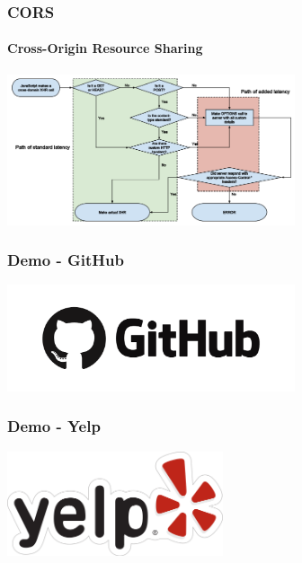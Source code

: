\documentclass{beamer}
\begin{document}
\begin{frame}
  \frametitle{CORS}
  \framesubtitle{Cross-Origin Resource Sharing}
  \begin{center}
    \includegraphics[width=320]{img/cors-diagram.png}
  \end{center}
\end{frame}


\begin{frame}
  \frametitle{Demo - GitHub}
  \begin{center}
    \includegraphics[width=320]{img/github-logo.png}
  \end{center}
\end{frame}


\begin{frame}
  \frametitle{Demo - Yelp}
  \begin{center}
    \includegraphics[width=240]{img/yelp-logo.png}
  \end{center}
\end{frame}
\end{document}
